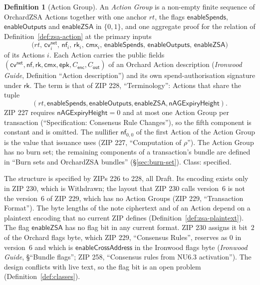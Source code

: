 \documentclass[11pt,a4paper]{article}
\theoremstyle{definition}
\newtheorem{definition}[theorem]{Definition}
\newcommand{\nfsym}{\mathsf{nf}}
\newcommand{\cmx}{\mathsf{cmx}}
\newcommand{\cvsym}{\mathsf{cv}}
\newcommand{\rk}{\mathsf{rk}}
\begin{document}
\begin{definition}[Action Group]\label{def:action-group}
An \emph{Action Group} is a non-empty finite sequence of OrchardZSA Actions
together with one anchor $\mathit{rt}$, the flags $\mathsf{enableSpends}$,
$\mathsf{enableOutputs}$ and $\mathsf{enableZSA}$ in $\{0, 1\}$, and one
aggregate proof for the relation of Definition~\ref{def:zsa-action} at the
primary inputs
\[
  \bigl(\mathit{rt},\, \cvsym^{\mathsf{net}}_i,\, \nfsym_i,\, \rk_i,\,
    \cmx_i,\, \mathsf{enableSpends},\, \mathsf{enableOutputs},\,
    \mathsf{enableZSA}\bigr)
\]
of its Actions $i$. Each Action carries the public fields
$(\cvsym^{\mathsf{net}},\allowbreak \nfsym,\allowbreak \rk,\allowbreak
\cmx,\allowbreak \mathsf{epk},\allowbreak C_{\mathsf{enc}},\allowbreak
C_{\mathsf{out}})$ of an Orchard Action description (\emph{Ironwood Guide},
Definition ``Action description'') and its own spend-authorisation
signature under $\rk$. The term is that of ZIP 228, ``Terminology'':
Actions that share the tuple
\[
  (\mathit{rt}, \mathsf{enableSpends}, \mathsf{enableOutputs},
  \mathsf{enableZSA}, \mathsf{nAGExpiryHeight}).
\]
ZIP 227 requires $\mathsf{nAGExpiryHeight} = 0$ and at most one Action
Group per transaction (``Specification: Consensus Rule Changes''), so the
fifth component is constant and is omitted. The
nullifier $\nfsym_{0,0}$ of the first Action of the Action Group is the
value that issuance uses (ZIP 227, ``Computation of $\rho$''). The Action
Group has no burn set; the remaining components of a transaction's bundle
are defined in ``Burn sets and OrchardZSA bundles''
(\S\ref{sec:burn-set}). Class: specified.
\end{definition}

The structure is specified by ZIPs 226 to 228, all Draft. Its encoding
exists only in ZIP 230, which is Withdrawn; the layout that ZIP 230 calls
version~$6$ is not the version~$6$ of ZIP 229, which has no Action Groups
(ZIP 229, ``Transaction Format''). The byte lengths of the note ciphertext
and of an Action depend on a plaintext encoding that no current ZIP defines
(Definition~\ref{def:zsa-plaintext}). The flag $\mathsf{enableZSA}$ has no
flag bit in any current format. ZIP 230 assigns it bit~$2$ of the Orchard
flags byte, which ZIP 229, ``Consensus Rules'', reserves as $0$ in
version~$6$ and which is $\mathsf{enableCrossAddress}$ in the Ironwood flags
byte (\emph{Ironwood Guide}, \S``Bundle flags''; ZIP 258, ``Consensus rules
from NU6.3 activation''). The design conflicts with live text, so the flag
bit is an open problem (Definition~\ref{def:classes}).
\end{document}
